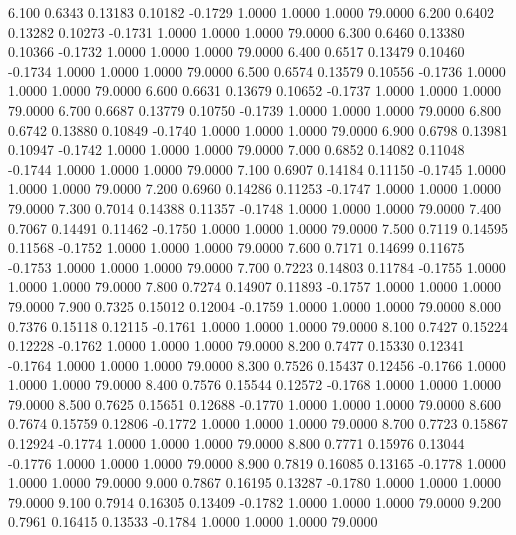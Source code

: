    6.100   0.6343   0.13183   0.10182  -0.1729   1.0000   1.0000   1.0000  79.0000
   6.200   0.6402   0.13282   0.10273  -0.1731   1.0000   1.0000   1.0000  79.0000
   6.300   0.6460   0.13380   0.10366  -0.1732   1.0000   1.0000   1.0000  79.0000
   6.400   0.6517   0.13479   0.10460  -0.1734   1.0000   1.0000   1.0000  79.0000
   6.500   0.6574   0.13579   0.10556  -0.1736   1.0000   1.0000   1.0000  79.0000
   6.600   0.6631   0.13679   0.10652  -0.1737   1.0000   1.0000   1.0000  79.0000
   6.700   0.6687   0.13779   0.10750  -0.1739   1.0000   1.0000   1.0000  79.0000
   6.800   0.6742   0.13880   0.10849  -0.1740   1.0000   1.0000   1.0000  79.0000
   6.900   0.6798   0.13981   0.10947  -0.1742   1.0000   1.0000   1.0000  79.0000
   7.000   0.6852   0.14082   0.11048  -0.1744   1.0000   1.0000   1.0000  79.0000
   7.100   0.6907   0.14184   0.11150  -0.1745   1.0000   1.0000   1.0000  79.0000
   7.200   0.6960   0.14286   0.11253  -0.1747   1.0000   1.0000   1.0000  79.0000
   7.300   0.7014   0.14388   0.11357  -0.1748   1.0000   1.0000   1.0000  79.0000
   7.400   0.7067   0.14491   0.11462  -0.1750   1.0000   1.0000   1.0000  79.0000
   7.500   0.7119   0.14595   0.11568  -0.1752   1.0000   1.0000   1.0000  79.0000
   7.600   0.7171   0.14699   0.11675  -0.1753   1.0000   1.0000   1.0000  79.0000
   7.700   0.7223   0.14803   0.11784  -0.1755   1.0000   1.0000   1.0000  79.0000
   7.800   0.7274   0.14907   0.11893  -0.1757   1.0000   1.0000   1.0000  79.0000
   7.900   0.7325   0.15012   0.12004  -0.1759   1.0000   1.0000   1.0000  79.0000
   8.000   0.7376   0.15118   0.12115  -0.1761   1.0000   1.0000   1.0000  79.0000
   8.100   0.7427   0.15224   0.12228  -0.1762   1.0000   1.0000   1.0000  79.0000
   8.200   0.7477   0.15330   0.12341  -0.1764   1.0000   1.0000   1.0000  79.0000
   8.300   0.7526   0.15437   0.12456  -0.1766   1.0000   1.0000   1.0000  79.0000
   8.400   0.7576   0.15544   0.12572  -0.1768   1.0000   1.0000   1.0000  79.0000
   8.500   0.7625   0.15651   0.12688  -0.1770   1.0000   1.0000   1.0000  79.0000
   8.600   0.7674   0.15759   0.12806  -0.1772   1.0000   1.0000   1.0000  79.0000
   8.700   0.7723   0.15867   0.12924  -0.1774   1.0000   1.0000   1.0000  79.0000
   8.800   0.7771   0.15976   0.13044  -0.1776   1.0000   1.0000   1.0000  79.0000
   8.900   0.7819   0.16085   0.13165  -0.1778   1.0000   1.0000   1.0000  79.0000
   9.000   0.7867   0.16195   0.13287  -0.1780   1.0000   1.0000   1.0000  79.0000
   9.100   0.7914   0.16305   0.13409  -0.1782   1.0000   1.0000   1.0000  79.0000
   9.200   0.7961   0.16415   0.13533  -0.1784   1.0000   1.0000   1.0000  79.0000

